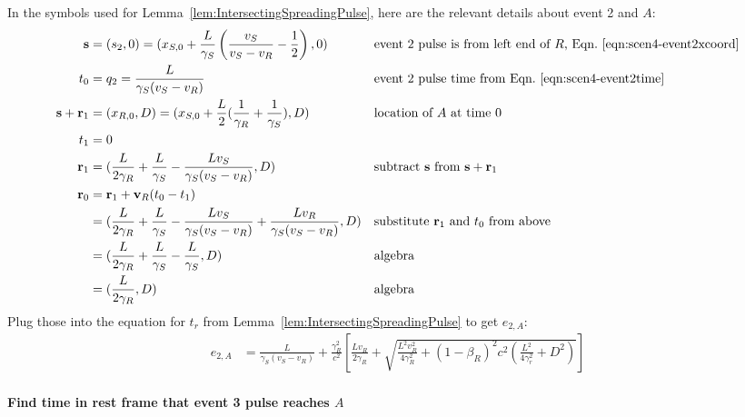 \documentclass[a4paper]{article}
\theoremstyle{plain}
\theoremstyle{definition}
\newcommand{\vect}[1]{\mathbf{#1}}
\begin{document}
In the symbols used for Lemma~\ref{lem:IntersectingSpreadingPulse},
here are the relevant details about event 2 and $A$:
\begin{align*}
\vect{s} & = (s_2,0) = (x_{S,0} + \frac{L}{\gamma_S} \left( \frac{v_S}{v_S - v_R} - \frac{1}{2} \right), 0) & & \text{event 2 pulse is from left end of $R$, Eqn.~\eqref{eqn:scen4-event2xcoord}} \\
t_0 & = q_2 = \frac{L}{\gamma_S(v_S - v_R)} & & \text{event 2 pulse time from Eqn.~\eqref{eqn:scen4-event2time}} \\
\vect{s} + \vect{r}_1 & = (x_{R,0}, D) = (x_{S,0} + \frac{L}{2} ( \frac{1}{\gamma_R} + \frac{1}{\gamma_S} ), D) & & \text{location of $A$ at time 0} \\
t_1 & = 0 \\
\vect{r}_1 & = (\frac{L}{2\gamma_R} + \frac{L}{\gamma_S} - \frac{Lv_S}{\gamma_S(v_S-v_R)}, D) & & \text{subtract $\vect{s}$ from $\vect{s}+\vect{r}_1$} \\
\vect{r}_0
  & = \vect{r}_1 + \vect{v}_R(t_0-t_1) \\
  & = (\frac{L}{2\gamma_R} + \frac{L}{\gamma_S} - \frac{Lv_S}{\gamma_S(v_S-v_R)} + \frac{Lv_R}{\gamma_S(v_S - v_R)}, D) & & \text{substitute $\vect{r}_1$ and $t_0$ from above} \\
  & = (\frac{L}{2\gamma_R} + \frac{L}{\gamma_S} - \frac{L}{\gamma_S}, D) & & \text{algebra} \\
  & = (\frac{L}{2\gamma_R}, D) & & \text{algebra}
\end{align*}
Plug those into the equation for $t_r$ from
Lemma~\ref{lem:IntersectingSpreadingPulse} to get $e_{2,A}$:
\begin{align*}
e_{2,A} & = \frac{L}{\gamma_S(v_S - v_R)} + \frac{\gamma_R^2}{c^2} \left[ \frac{Lv_R}{2\gamma_R} + \sqrt{\frac{L^2v_R^2}{4\gamma_R^2} + (1-\beta_R)^2c^2 (\frac{L^2}{4\gamma_r^2} + D^2)} \right]
\end{align*}


\paragraph{Find time in rest frame that event 3 pulse reaches $A$}
\end{document}
